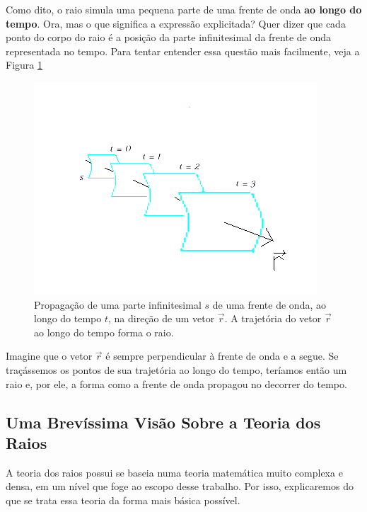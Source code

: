             Como dito, o raio simula uma pequena parte de uma frente de onda \textbf{ao longo do tempo}. Ora, mas o que significa a expressão explicitada? Quer dizer que cada ponto do corpo do raio é a posição da parte infinitesimal da frente de onda representada no tempo. Para tentar entender essa questão mais facilmente, veja a Figura \ref{fig:ray&WavePropagation}
            \begin{figure}[H]
                \centering
                \includegraphics[scale=.8]{imagens/ilustracoes/ray.png}
                \caption{Propagação de uma parte infinitesimal $s$ de uma frente de onda, ao longo do tempo $t$, na direção de um vetor $\vec{r}$. A trajetória do vetor $\vec{r}$ ao longo do tempo forma o raio.}
                \label{fig:ray&WavePropagation}
            \end{figure}
            Imagine que o vetor $\vec{r}$ é sempre perpendicular à frente de onda e a segue. Se traçássemos os pontos de sua trajetória ao longo do tempo, teríamos então um raio e, por ele, a forma como a frente de onda propagou no decorrer do tempo.
            
            \subsection{Uma Brevíssima Visão Sobre a Teoria dos Raios}
            
                A teoria dos raios possui se baseia numa teoria matemática muito complexa e densa, em um nível que foge ao escopo desse trabalho. Por isso, explicaremos do que se trata essa teoria da forma mais básica possível.
                
